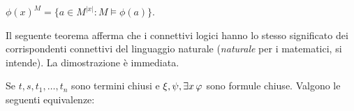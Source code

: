\hfil$\phi(x)^M=\big\{a\in M^{|x|}: M\models\phi(a)\big\}$.

Il seguente teorema afferma che i connettivi logici hanno lo stesso significato dei corrispondenti connettivi del linguaggio naturale (\textit{naturale\/} per i matematici, si intende). La dimostrazione \`e immediata.


\begin{theorem}\label{corrispondenzaconnettivi}
Se $t,s,t_1,\dots,t_n$ sono termini chiusi e $\xi,\psi,\exists x\,\varphi$ sono formule chiuse. Valgono le seguenti equivalenze:
\end{theorem}

